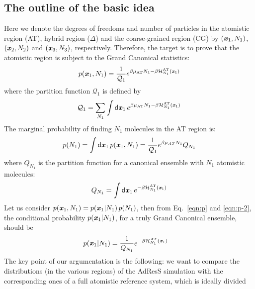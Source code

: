 \documentclass[aip,jcp,a4paper,reprint,onecolumn]{revtex4-1}
\newcommand{\redc}[1]{{\color{red} #1}}
\newcommand{\vect}[1]{\textbf{\textit{#1}}}
\newcommand{\dd}[1]{\textsf{#1}}
\newcommand{\AT}{{\textrm{{AT}}}}
\newcommand{\HY}{{\Delta}}
\begin{document}
\subsection{The outline of the basic idea}
Here we denote the degrees of freedoms and number of particles in the
atomistic region (AT), hybrid region ($\HY$) and the coarse-grained
region (CG) by $(\vect x_1, N_1)$, $(\vect x_2, N_2)$ and $(\vect x_3,
N_3)$, respectively. Therefore, the target is to prove that the atomistic
region is subject to the Grand Canonical statistics: 
\begin{align}\label{eqn:p}
  p(\vect x_1, N_1) = \frac{1}{\mathcal Q_1}
  e^{\beta\mu_{\AT} N_1 - \beta \mathcal H_{N_1}^{\AT}(\vect x_1)} 
\end{align}
where the partition function $\mathcal Q_1$ is defined by
\begin{align}
  \mathcal Q_1 =
  \sum_{N_1}\int
  \dd d\vect x_1\,
  e^{\beta\mu_{\AT} N_1 - \beta \mathcal H_{N_1}^{\AT}(\vect x_1)}
\end{align}
The marginal probability of finding $N_1$ molecules in the
AT region is:
\begin{align}\label{eqn:p-2}
  p(N_1) = \int\dd d\vect x_1\, p(\vect x_1, N_1)
  =
  \frac{1}{\mathcal Q_1}e^{\beta\mu_{AT} N_1}Q_{N_1}
\end{align}
where $Q_{N_1}$ is the partition function for a canonical ensemble
with $N_1$ atomistic molecules:
\begin{align}
  Q_{N_1}  =
  \int\dd d\vect x_1\,
  e^{ - \beta \mathcal H_{N_1}^{\AT}(\vect x_1)}
\end{align}
\redc{Let us consider
$p(\vect x_1, N_1) = p(\vect x_1 | N_1)\,p(N_1)$, then
from Eq.~\eqref{eqn:p} and \eqref{eqn:p-2},
the conditional probability $p(\vect x_1 | N_1)$,
for a truly Grand Canonical ensemble,
should be}
\begin{align}\label{eqn:p-1}
  p(\vect x_1 | N_1) &= \frac{1}{Q_{N_1}} e^{-\beta \mathcal H_{N_1}^{AT}(\vect x_1)} \end{align}
The key point of our argumentation is the following: we want to compare
the distributions (in the various regions) of the AdResS simulation
with the corresponding ones of a full atomistic reference system, which is ideally divided
\end{document}
